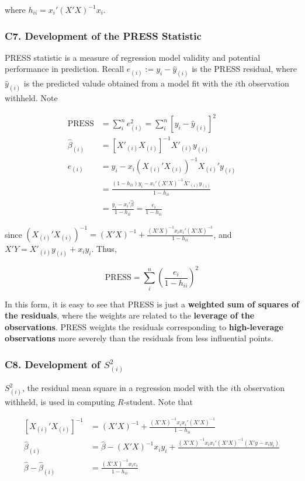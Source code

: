 \documentclass[12pt]{article}
\begin{document}
where $h_{ii} = x_i' (X'X)^{-1} x_i$. 


\subsubsection*{C7. Development of the PRESS Statistic}

PRESS statistic is a measure of regression model validity and potential performance in prediction. Recall $e_{(i)} := y_i - \hat{y}_{(i)}$ is the PRESS residual, where $\hat{y}_{(i)}$ is the predicted valude obtained from a model fit with the $i$th observation withheld. Note

$$
\begin{aligned}
\mathrm{PRESS} &= \sum_i^n e_{(i)}^2 = \sum_i^n [ y_i - \hat{y}_{(i)} ]^2 \\[8pt]
\hat{\beta}_{(i)} &= [X'_{(i)} X_{(i)}]^{-1} X'_{(i)} y_{(i)} \\[10pt]
e_{(i)} &= y_i - x_i(X_{(i)}' X_{(i)})^{-1} X_{(i)}' y_{(i)} \\[8pt]
&= \frac{ (1 - h_{ii})y_i - x_i' (X'X)^{-1} X'_{(i)} y_(i) } {  1 - h_{ii} } \\[8pt]
&= \frac{ y_i - x_i' \hat{\beta}  }{ 1 - h_{ii} } = \frac{ e_i}{ 1 - h_{ii} }
\end{aligned}
$$

since $(X_{(i)}' X_{(i)})^{-1} = (X'X)^{-1} + \frac{ (X'X)^{-1}x_ix_i'(X'X)^{-1} }{ 1 - h_{ii} }$, and $X'Y = X'_{(i)}y_{(i)} + x_iy_i $. Thus,


$$
\mathrm{PRESS} = \sum_i^n \left( \frac{e_i}{1 - h_{ii}} \right)^2
$$

In this form, it is easy to see that PRESS is just a \textbf{weighted sum of squares of the residuals}, where the weights are related to the \textbf{leverage of the observations}. PRESS weights the residuals corresponding to \textbf{high-leverage observations} more severely than the residuals from less influential points.




\subsubsection*{C8. Development of $S_{(i)}^2$ }

$S_{(i)}^2$, the residual mean square in a regression model with the $i$th observation withheld, is used in computing $R$-student. Note that 

$$
\begin{aligned}
\left[X_{(i)}' X_{(i)}\right]^{-1} &= (X'X)^{-1} + \frac{(X'X)^{-1} x_i x_i' (X'X)^{-1} }{1-h_{ii}} \\[10pt]
\hat{\beta}_{(i)} &= \hat{\beta} - (X'X)^{-1}x_i y_i + \frac{ (X'X)^{-1} x_ix_i' (X'X)^{-1} (X'y - x_iy_i) }{  } \\[8pt]
\hat{\beta} - \hat{\beta}_{(i)} &= \frac{(X'X)^{-1} x_i e_i}{1 - h_{ii}}
\end{aligned}
$$
\end{document}
